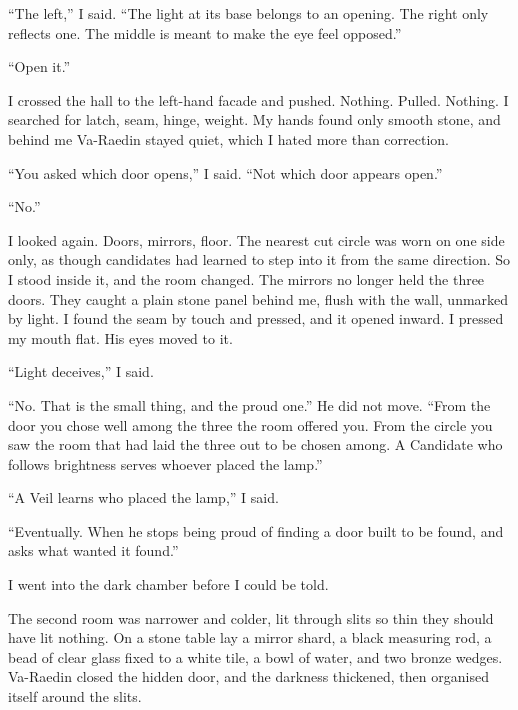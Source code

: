``The left,'' I said. ``The light at its base belongs to an opening. The right only reflects one. The middle is meant to make the eye feel opposed.''\par
``Open it.''\par

I crossed the hall to the left-hand facade and pushed. Nothing. Pulled. Nothing. I searched for latch, seam, hinge, weight. My hands found only smooth stone, and behind me Va-Raedin stayed quiet, which I hated more than correction.\par

``You asked which door opens,'' I said. ``Not which door appears open.''\par

``No.''\par

I looked again. Doors, mirrors, floor. The nearest cut circle was worn on one side only, as though candidates had learned to step into it from the same direction. So I stood inside it, and the room changed. The mirrors no longer held the three doors. They caught a plain stone panel behind me, flush with the wall, unmarked by light. I found the seam by touch and pressed, and it opened inward. I pressed my mouth flat. His eyes moved to it.\par

``Light deceives,'' I said.\par
``No. That is the small thing, and the proud one.'' He did not move. ``From the door you chose well among the three the room offered you. From the circle you saw the room that had laid the three out to be chosen among. A Candidate who follows brightness serves whoever placed the lamp.''\par
``A Veil learns who placed the lamp,'' I said.\par
``Eventually. When he stops being proud of finding a door built to be found, and asks what wanted it found.''\par

I went into the dark chamber before I could be told.\par

\ornament

The second room was narrower and colder, lit through slits so thin they should have lit nothing. On a stone table lay a mirror shard, a black measuring rod, a bead of clear glass fixed to a white tile, a bowl of water, and two bronze wedges. Va-Raedin closed the hidden door, and the darkness thickened, then organised itself around the slits.\par


